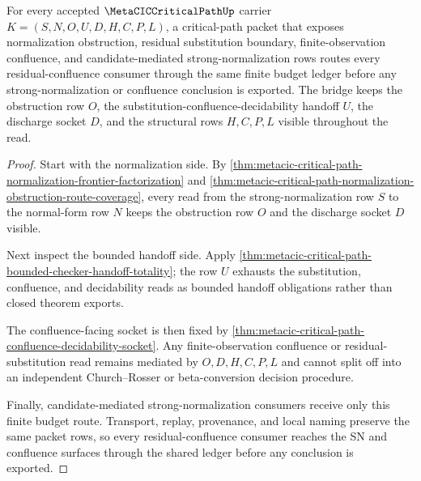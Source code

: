 \begin{theorem}
\label{thm:metacic-critical-path-residual-confluence-budget-bridge}
For every accepted $\MetaCICCriticalPathUp$ carrier $K=(S,N,O,U,D,H,C,P,L)$, a critical-path packet that exposes normalization obstruction, residual substitution boundary, finite-observation confluence, and candidate-mediated strong-normalization rows routes every residual-confluence consumer through the same finite budget ledger before any strong-normalization or confluence conclusion is exported. The bridge keeps the obstruction row $O$, the substitution-confluence-decidability handoff $U$, the discharge socket $D$, and the structural rows $H,C,P,L$ visible throughout the read.
\end{theorem}
\begin{proof}
Start with the normalization side. By \autoref{thm:metacic-critical-path-normalization-frontier-factorization} and \autoref{thm:metacic-critical-path-normalization-obstruction-route-coverage}, every read from the strong-normalization row $S$ to the normal-form row $N$ keeps the obstruction row $O$ and the discharge socket $D$ visible.

Next inspect the bounded handoff side. Apply \autoref{thm:metacic-critical-path-bounded-checker-handoff-totality}; the row $U$ exhausts the substitution, confluence, and decidability reads as bounded handoff obligations rather than closed theorem exports.

The confluence-facing socket is then fixed by \autoref{thm:metacic-critical-path-confluence-decidability-socket}. Any finite-observation confluence or residual-substitution read remains mediated by $O,D,H,C,P,L$ and cannot split off into an independent Church--Rosser or beta-conversion decision procedure.

Finally, candidate-mediated strong-normalization consumers receive only this finite budget route. Transport, replay, provenance, and local naming preserve the same packet rows, so every residual-confluence consumer reaches the SN and confluence surfaces through the shared ledger before any conclusion is exported.
\end{proof}

